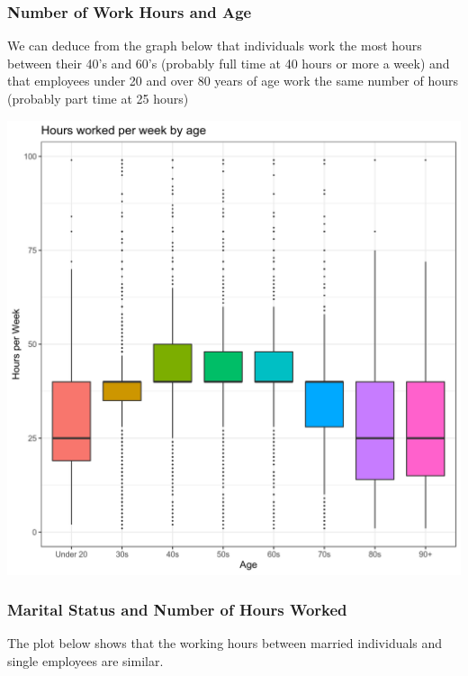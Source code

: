 \documentclass[]{article}
\begin{document}
\hypertarget{number-of-work-hours-and-age}{%
\subsubsection{Number of Work Hours and
Age}\label{number-of-work-hours-and-age}}

We can deduce from the graph below that individuals work the most hours
between their 40's and 60's (probably full time at 40 hours or more a
week) and that employees under 20 and over 80 years of age work the same
number of hours (probably part time at 25 hours)

\includegraphics{../images/Plot_3_Hours_worked_per_week_by_age.png}

\hypertarget{marital-status-and-number-of-hours-worked}{%
\subsubsection{Marital Status and Number of Hours
Worked}\label{marital-status-and-number-of-hours-worked}}

The plot below shows that the working hours between married individuals
and single employees are similar.
\end{document}
